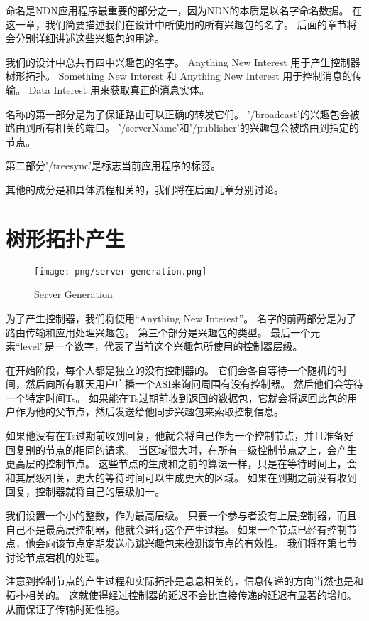命名是NDN应用程序最重要的部分之一，因为NDN的本质是以名字命名数据。
在这一章，我们简要描述我们在设计中所使用的所有兴趣包的名字。
后面的章节将会分别详细讲述这些兴趣包的用途。

我们的设计中总共有四中兴趣包的名字。
Anything New Interest 用于产生控制器树形拓扑。
Something New Interest 和 Anything New Interest 用于控制消息的传输。
Data Interest 用来获取真正的消息实体。

名称的第一部分是为了保证路由可以正确的转发它们。
’/broadcast’的兴趣包会被路由到所有相关的端口。
’/serverName’和’/publisher’的兴趣包会被路由到指定的节点。

第二部分’/treesync’是标志当前应用程序的标签。

其他的成分是和具体流程相关的，我们将在后面几章分别讨论。


\section{树形拓扑产生}

\begin{figure}
\centering
\texttt{[image: png/server-generation.png]}
\caption{Server Generation}
\label{server_generation}
\end{figure}

为了产生控制器，我们将使用“Anything New Interest”。
名字的前两部分是为了路由传输和应用处理兴趣包。
第三个部分是兴趣包的类型。
最后一个元素“level”是一个数字，代表了当前这个兴趣包所使用的控制器层级。

在开始阶段，每个人都是独立的没有控制器的。
它们会各自等待一个随机的时间，然后向所有聊天用户广播一个ASI来询问周围有没有控制器。
然后他们会等待一个特定时间Ts。
如果能在Ts过期前收到返回的数据包，它就会将返回此包的用户作为他的父节点，然后发送给他同步兴趣包来索取控制信息。

如果他没有在Ts过期前收到回复，他就会将自己作为一个控制节点，并且准备好回复别的节点的相同的请求。
当区域很大时，在所有一级控制节点之上，会产生更高层的控制节点。
这些节点的生成和之前的算法一样，只是在等待时间上，会和其层级相关，更大的等待时间可以生成更大的区域。
如果在到期之前没有收到回复，控制器就将自己的层级加一。

我们设置一个小的整数，作为最高层级。
只要一个参与者没有上层控制器，而且自己不是最高层控制器，他就会进行这个产生过程。
如果一个节点已经有控制节点，他会向该节点定期发送心跳兴趣包来检测该节点的有效性。
我们将在第七节讨论节点宕机的处理。

注意到控制节点的产生过程和实际拓扑是息息相关的，信息传递的方向当然也是和拓扑相关的。
这就使得经过控制器的延迟不会比直接传递的延迟有显著的增加。
从而保证了传输时延性能。



